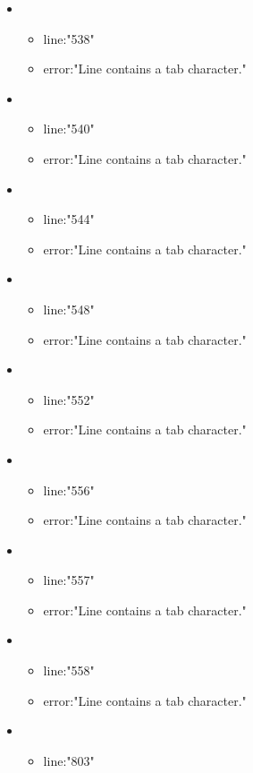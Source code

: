 \begin{itemize}
	\item 
	\begin{itemize} 
		\item line:"538" 
		\item error:"Line contains a tab character." 
	\end{itemize}
	\item 
	\begin{itemize} 
		\item line:"540" 
		\item error:"Line contains a tab character." 
	\end{itemize}
	\item 
	\begin{itemize} 
		\item line:"544" 
		\item error:"Line contains a tab character." 
	\end{itemize}
	\item 
	\begin{itemize} 
		\item line:"548" 
		\item error:"Line contains a tab character." 
	\end{itemize}
	\item 
	\begin{itemize} 
		\item line:"552" 
		\item error:"Line contains a tab character." 
	\end{itemize}
	\item 
	\begin{itemize} 
		\item line:"556" 
		\item error:"Line contains a tab character." 
	\end{itemize}
	\item 
	\begin{itemize} 
		\item line:"557" 
		\item error:"Line contains a tab character." 
	\end{itemize}
	\item 
	\begin{itemize} 
		\item line:"558" 
		\item error:"Line contains a tab character." 
	\end{itemize}
	\item 
	\begin{itemize} 
		\item line:"803" 

\end{itemize}
\end{itemize}
